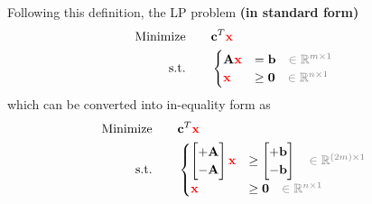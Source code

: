 \documentclass[twocolumn]{ctexart}
\begin{document}
\vspace{20pt}


Following this definition,
the LP problem \textbf{\color{blue} (in standard form)}
\begin{equation}
    \begin{aligned}
        \label{eq:primal_standard}
        \text{Minimize} \qquad &
            \mathbf{c}^T  \mathbf{\color{red} x}
        \\
        \text{s.t.} \qquad &
            \begin{cases}
                \mathbf{A}  \mathbf{\color{red} x}  &  =     \mathbf{b}  {\color{gray} \quad \in \mathbb{R}^{m \times 1}}  \\
                            \mathbf{\color{red} x}  &  \geq  \mathbf{0}  {\color{gray} \quad \in \mathbb{R}^{n \times 1}}  \\
            \end{cases}
    \end{aligned}
\end{equation}
which can be converted into in-equality form as
\begin{equation}
    \begin{aligned}
        \label{eq:primal_standard_converted}
        \text{Minimize} \qquad &
            \mathbf{c}^T  \mathbf{\color{red} x}
        \\
        \text{s.t.} \qquad &
            \begin{cases}
                \begin{bmatrix}  +\mathbf{A}  \\  -\mathbf{A} \end{bmatrix}
                \mathbf{\color{red} x}
                &  \geq
                \begin{bmatrix}  +\mathbf{b}  \\  -\mathbf{b} \end{bmatrix}
                {\color{gray} \quad \in \mathbb{R}^{(2m) \times 1}}  \\
                             \mathbf{\color{red} x}  &  \geq   \mathbf{0}  {\color{gray} \quad \in \mathbb{R}^{n \times 1}}  \\
            \end{cases}
    \end{aligned}
\end{equation}
\end{document}
